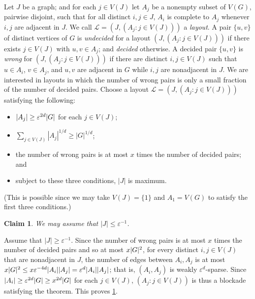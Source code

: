 \documentclass[11pt,reqno,a4paper]{amsart}
\newtheorem{claim}{Claim}[theorem]
\let\oldendproof\endproof
\renewenvironment{proof}[1][\proofname]{%
	\oldproof[\normalfont\bfseries #1]%
}{\oldendproof}
\renewcommand{\qedsymbol}{$\blacksquare$}%
\newenvironment{subproof}[1][\normalfont\it Subproof]{%
	\renewcommand{\qedsymbol}{$\square$}%
	\begin{proof}[#1]%
	}{%
	\end{proof}%
}
\newcommand{\eps}{\varepsilon}
\DeclarePairedDelimiter\abs{\lvert}{\rvert}%
\begin{document}
	\begin{proof}
		Let $J$ be a graph; and for each $j\in V(J)$ let $A_j$ be a nonempty subset of $V(G)$, pairwise disjoint, such that for all distinct $i,j\in J$, $A_i$ is complete to $A_j$ whenever $i,j$ are adjacent in $J$. We call $\mathcal{L}=(J,(A_j:j\in V(J)))$
		a {\em layout}. A pair $\{u,v\}$ of distinct vertices of $G$ is {\em undecided} for a layout $(J,(A_j:j\in V(J)))$
		if there exists $j\in V(J)$ with $u,v\in A_j$; and {\em decided} otherwise.
		A decided pair $\{u,v\}$ is {\em wrong} for $(J,(A_j:j\in V(J)))$ if there are distinct
		$i,j\in V(J)$ such that $u\in A_i$, $v\in A_j$, and $u,v$ are adjacent in $G$ while $i,j$ are nonadjacent in $J$.
		We are interested in layouts in which the number of wrong pairs is only a small fraction of the number of decided pairs.
		Choose a layout $\mathcal{L}=(J,(A_j:j\in V(J)))$ satisfying the following:
		\begin{itemize}
			\item $\abs{A_j}\ge \eps^{2d}\abs G$ for each $j\in V(J)$;
			\item $\sum_{j\in V(J)}|A_j|^{1/d}\ge |G|^{1/d}$;
			\item the number of wrong pairs is at most $x$ times the number of decided pairs; and
			\item subject to these three conditions, $|J|$ is maximum.
		\end{itemize}
		(This is possible since we may take $V(J)=\{1\}$ and $A_1=V(G)$ to satisfy the first three conditions.)
		\begin{claim}
			\label{claim:short}
			We may assume that $|J|\le \eps^{-1}$.
		\end{claim}
		\begin{subproof}
			Assume that $|J|\ge \eps^{-1}$. 
			Since the number of wrong pairs is at most $x$ times the number of decided pairs and so at most $x\abs G^2$,
			for every distinct $i,j\in V(J)$ that are nonadjacent in $J$,
			the number of edges between $A_i,A_j$ is at most $x\abs G^2\le x\eps^{-4d}\abs{A_i}\abs{A_j}=\eps^d\abs{A_i}\abs{A_j}$;
			that is, $(A_i,A_j)$ is weakly $\eps^d$-sparse.
			Since $\abs{A_i}\ge\eps^{2d}\abs G\ge x^{2d}\abs G$ for each $j\in V(J)$,
			$(A_j:j\in V(J))$ is thus a blockade satisfying the theorem.
			This proves \cref{claim:short}. 
		\end{subproof}
		

\end{proof}
\end{document}
